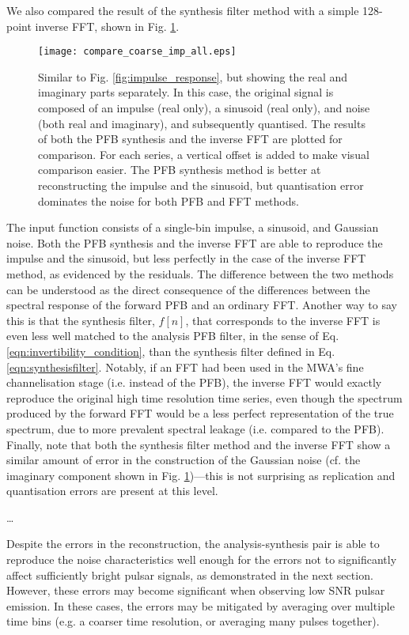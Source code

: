 \documentclass{pasa}%
\begin{document}
We also compared the result of the synthesis filter method with a simple 128-point inverse FFT, shown in Fig. \ref{fig:imp_sin_noise}.
\begin{figure}
    \centering
    \texttt{[image: compare\_coarse\_imp\_all.eps]}
    \caption{Similar to Fig. \ref{fig:impulse_response}, but showing the real and imaginary parts separately. In this case, the original signal is composed of an impulse (real only), a sinusoid (real only), and noise (both real and imaginary), and subsequently quantised. The results of both the PFB synthesis and the inverse FFT are plotted for comparison. For each series, a vertical offset is added to make visual comparison easier. The PFB synthesis method is better at reconstructing the impulse and the sinusoid, but quantisation error dominates the noise for both PFB and FFT methods.}
    \label{fig:imp_sin_noise}
\end{figure}
The input function consists of a single-bin impulse, a sinusoid, and Gaussian noise.
Both the PFB synthesis and the inverse FFT are able to reproduce the impulse and the sinusoid, but less perfectly in the case of the inverse FFT method, as evidenced by the residuals.
The difference between the two methods can be understood as the direct consequence of the differences between the spectral response of the forward PFB and an ordinary FFT.
Another way to say this is that the synthesis filter, $f[n]$, that corresponds to the inverse FFT is even less well matched to the analysis PFB filter, in the sense of Eq. \eqref{eqn:invertibility_condition}, than the synthesis filter defined in Eq. \eqref{eqn:synthesisfilter}.
Notably, if an FFT had been used in the MWA's fine channelisation stage (i.e. instead of the PFB), the inverse FFT would exactly reproduce the original high time resolution time series, even though the spectrum produced by the forward FFT would be a less perfect representation of the true spectrum, due to more prevalent spectral leakage (i.e. compared to the PFB).
Finally, note that both the synthesis filter method and the inverse FFT show a similar amount of error in the construction of the Gaussian noise (cf. the imaginary component shown in Fig. \ref{fig:imp_sin_noise})---this is not surprising as replication and quantisation errors are present at this level.

\dots

Despite the errors in the reconstruction, the analysis-synthesis pair is able to reproduce the noise characteristics well enough for the errors not to significantly affect sufficiently bright pulsar signals, as demonstrated in the next section.
However, these errors may become significant when observing low SNR pulsar emission. In these cases, the errors may be mitigated by averaging over multiple time bins (e.g. a coarser time resolution, or averaging many pulses together).
\end{document}

